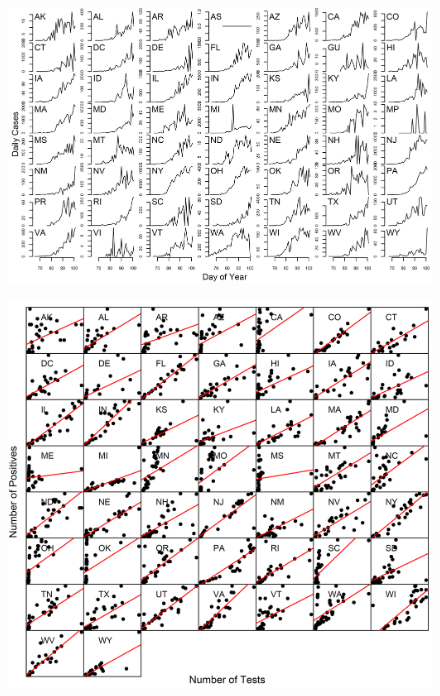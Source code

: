 \documentclass[11pt]{article}
\begin{document}
\begin{figure}
\centering
\hspace*{0cm}\includegraphics[width=16cm]{states_daily_cases.png}
\caption{}
\label{fig:bends}
\end{figure} 

\begin{figure}
\centering
\hspace*{0cm}\includegraphics[width=14cm]{number_of_tests_vs_positives.png}
\caption{}
\label{fig:bends}
\end{figure} 
\end{document}
